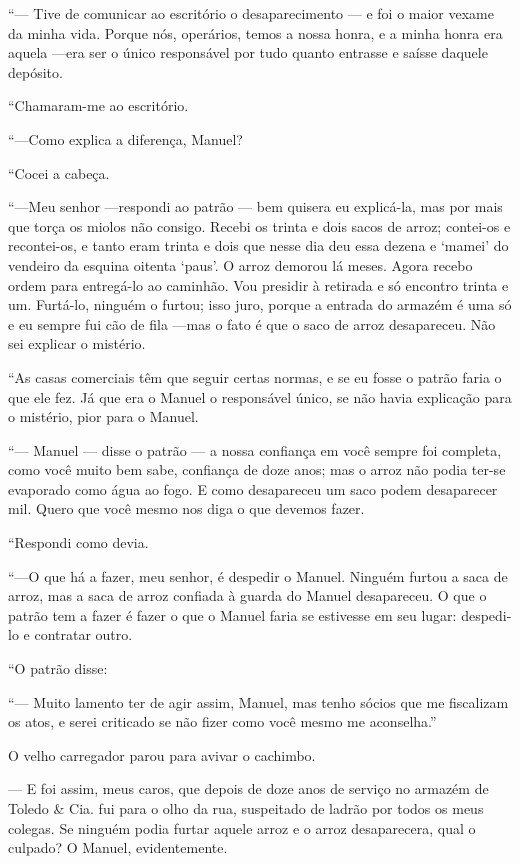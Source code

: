 ``--- Tive de comunicar ao escritório o desaparecimento --- e foi o
maior vexame da minha vida. Porque nós, operários, temos a nossa honra,
e a minha honra era aquela ---era ser o único responsável por tudo
quanto entrasse e saísse daquele depósito.

``Chamaram-me ao escritório.

``---Como explica a diferença, Manuel?

``Cocei a cabeça.

``---Meu senhor ---respondi ao patrão --- bem quisera eu explicá-la, mas
por mais que torça os miolos não consigo. Recebi os trinta e dois sacos
de arroz; contei-os e recontei-os, e tanto eram trinta e dois que nesse
dia deu essa dezena e `mamei' do vendeiro da esquina oitenta `paus'. O
arroz demorou lá meses. Agora recebo ordem para entregá-lo ao caminhão.
Vou presidir à retirada e só encontro trinta e um. Furtá-lo, ninguém o
furtou; isso juro, porque a entrada do armazém é uma só e eu sempre fui
cão de fila ---mas o fato é que o saco de arroz desapareceu. Não sei
explicar o mistério.

``As casas comerciais têm que seguir certas normas, e se eu fosse o
patrão faria o que ele fez. Já que era o Manuel o responsável único, se
não havia explicação para o mistério, pior para o Manuel.

``--- Manuel --- disse o patrão --- a nossa confiança em você sempre foi
completa, como você muito bem sabe, confiança de doze anos; mas o arroz
não podia ter-se evaporado como água ao fogo. E como desapareceu um saco
podem desaparecer mil. Quero que você mesmo nos diga o que devemos
fazer.

``Respondi como devia.

``---O que há a fazer, meu senhor, é despedir o Manuel. Ninguém furtou a
saca de arroz, mas a saca de arroz confiada à guarda do Manuel
desapareceu. O que o patrão tem a fazer é fazer o que o Manuel faria se
estivesse em seu lugar: despedi-lo e contratar outro.

``O patrão disse:

``--- Muito lamento ter de agir assim, Manuel, mas tenho sócios que me
fiscalizam os atos, e serei criticado se não fizer como você mesmo me
aconselha.''

O velho carregador parou para avivar o cachimbo.

--- E foi assim, meus caros, que depois de doze anos de serviço no
armazém de Toledo \& Cia. fui para o olho da rua, suspeitado de ladrão
por todos os meus colegas. Se ninguém podia furtar aquele arroz e o
arroz desaparecera, qual o culpado? O Manuel, evidentemente.

